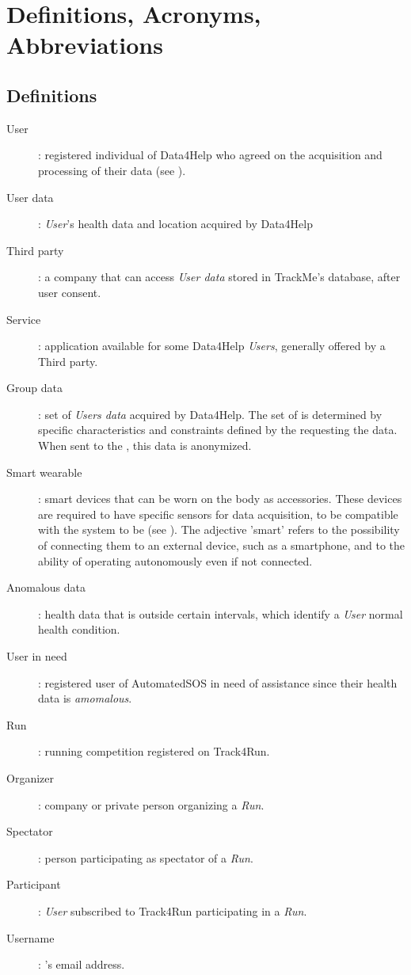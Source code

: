 \documentclass[../../rasd.tex]{subfiles}
\begin{document}
\section{Definitions, Acronyms, Abbreviations}
		\subsection{Definitions}
		\begin{description}
			\item[User]: registered individual of Data4Help who agreed on the acquisition and processing of their data (see ).
			\item[User data]: \textit{User}'s health data and location acquired by Data4Help
			\item[Third party]: a company that can access \textit{User data} stored in TrackMe's database, after user consent.
			\item[Service]: application available for some Data4Help \textit{Users}, generally offered by a Third party.
			\item[Group data]: set of \textit{Users data} acquired by Data4Help. The set of  is determined by specific characteristics and constraints defined by the  requesting the data. When sent to the , this data is anonymized.
			\item[Smart wearable]: smart devices that can be worn on the body as accessories. These devices are required to have specific sensors for data acquisition, to be compatible with the system to be (see ). The adjective 'smart' refers to the possibility of connecting them to an external device, such as a smartphone, and to the ability of operating autonomously even if not connected.
			\item[Anomalous data]: health data that is outside certain intervals, which identify a \textit{User} normal health condition. 
			\item[User in need]: registered user of AutomatedSOS in need of assistance since their health data is \textit{amomalous}.
			\item[Run]: running competition registered on Track4Run. 
			\item[Organizer]: company or private person organizing a \textit{Run}.
			\item[Spectator]: person participating as spectator of a \textit{Run}.
			\item[Participant]: \textit{User} subscribed to Track4Run participating in a \textit{Run}.
			\item[Username]: 's email address.


		\end{description}
\end{document}
